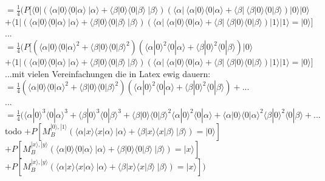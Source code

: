 \documentclass[a4paper]{scrartcl}
\begin{document}
\begin{enumerate}[a)]
$=\frac{1}{4} (P[ \langle 0|(\langle \alpha|0\rangle \langle 0|\alpha\rangle~|\alpha\rangle + \langle \beta|0\rangle \langle 0|\beta\rangle~|\beta\rangle) (\langle \alpha|~\langle \alpha|0\rangle \langle 0|\alpha\rangle + \langle \beta|~\langle \beta|0\rangle \langle 0|\beta\rangle)|0\rangle |0\rangle$\\
$+ \langle 1|(\langle \alpha|0\rangle \langle 0|\alpha\rangle~|\alpha\rangle + \langle \beta|0\rangle \langle 0|\beta\rangle~|\beta\rangle) (\langle \alpha|~\langle \alpha|0\rangle \langle 0|\alpha\rangle + \langle \beta|~\langle \beta|0\rangle \langle 0|\beta\rangle)|1\rangle |1\rangle =|0\rangle]$\\

...\\
$=\frac{1}{4} (P[ (\langle \alpha|0\rangle \langle 0|\alpha\rangle^2 + \langle \beta|0\rangle \langle 0|\beta\rangle^2) (\langle \alpha|0\rangle^2 \langle 0|\alpha\rangle + \langle \beta|0\rangle^2 \langle 0|\beta\rangle) |0\rangle$\\
$+ \langle 1|(\langle \alpha|0\rangle \langle 0|\alpha\rangle~|\alpha\rangle + \langle \beta|0\rangle \langle 0|\beta\rangle~|\beta\rangle) (\langle \alpha|~\langle \alpha|0\rangle \langle 0|\alpha\rangle + \langle \beta|~\langle \beta|0\rangle \langle 0|\beta\rangle)|1\rangle |1\rangle =|0\rangle]$\\

...mit vielen Vereinfachungen die in Latex ewig dauern:\\
$=\frac{1}{4} (\langle \alpha|0\rangle \langle 0|\alpha\rangle^2 + \langle \beta|0\rangle \langle 0|\beta\rangle^2) (\langle \alpha|0\rangle^2 \langle 0|\alpha\rangle + \langle \beta|0\rangle^2 \langle 0|\beta\rangle) +...$\\

...\\
$=\frac{1}{4} (\langle \alpha|0\rangle^3 \langle 0|\alpha\rangle^3 + \langle \beta|0\rangle^3 \langle 0|\beta\rangle^3 + \langle \beta|0\rangle \langle 0|\beta\rangle^2 \langle \alpha|0\rangle^2 \langle 0|\alpha\rangle + \langle \alpha|0\rangle \langle 0|\alpha\rangle^2 \langle \beta|0\rangle^2 \langle 0|\beta\rangle+...$\\




todo
$+ P[M_B^{|0\rangle,|1\rangle}(\langle \alpha|x\rangle \langle x|\alpha\rangle~|\alpha\rangle + \langle \beta|x\rangle \langle x|\beta\rangle~|\beta\rangle)=|0\rangle]$\\
$+ P[M_B^{|x\rangle,|y\rangle}(\langle \alpha|0\rangle \langle 0|\alpha\rangle~|\alpha\rangle + \langle \beta|0\rangle \langle 0|\beta\rangle~|\beta\rangle)=|x\rangle]$\\
$+ P[M_B^{|x\rangle,|y\rangle}(\langle \alpha|x\rangle \langle x|\alpha\rangle~|\alpha\rangle + \langle \beta|x\rangle \langle x|\beta\rangle~|\beta\rangle)=|x\rangle])$\\





\end{enumerate}
\end{document}
